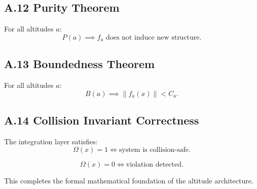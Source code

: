 \subsection*{A.12 Purity Theorem}

For all altitudes $a$:
\[
P(a) \implies f_a \text{ does not induce new structure.}
\]

\subsection*{A.13 Boundedness Theorem}

For all altitudes $a$:
\[
B(a) \implies \|f_a(x)\| < C_a.
\]

\subsection*{A.14 Collision Invariant Correctness}

The integration layer satisfies:
\[
\Omega(x) = 1 \iff \text{system is collision‑safe}.
\]

\[
\Omega(x) = 0 \iff \text{violation detected}.
\]

This completes the formal mathematical foundation of the altitude architecture.
